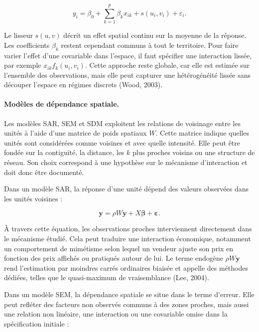 \documentclass[11pt,a4paper]{article}
\begin{document}
\begin{equation}
    y_i=\beta_0+\sum_{k=1}^{p}\beta_kx_{ik}+s(u_i,v_i)+\varepsilon_i.
\end{equation}

Le lisseur $s(u,v)$ décrit un effet spatial continu sur la moyenne de la réponse. Les coefficients $\beta_k$ restent cependant communs à tout le territoire. Pour faire varier l'effet d'une covariable dans l'espace, il faut spécifier une interaction lissée, par exemple $x_{ik}f_k(u_i,v_i)$. Cette approche reste globale, car elle est estimée sur l'ensemble des observations, mais elle peut capturer une hétérogénéité lissée sans découper l'espace en régimes discrets (Wood, 2003).

\paragraph{Modèles de dépendance spatiale.}

Les modèles SAR, SEM et SDM exploitent les relations de voisinage entre les unités à l'aide d'une matrice de poids spatiaux $W$. Cette matrice indique quelles unités sont considérées comme voisines et avec quelle intensité. Elle peut être fondée sur la contiguïté, la distance, les $k$ plus proches voisins ou une structure de réseau. Son choix correspond à une hypothèse sur le mécanisme d'interaction et doit donc être documenté.

Dans un modèle SAR, la réponse d'une unité dépend des valeurs observées dans les unités voisines :

\begin{equation}
    \mathbf{y}=\rho W\mathbf{y}+X\boldsymbol{\beta}+\boldsymbol{\varepsilon}.
\end{equation}

À travers cette équation, les observations proches interviennent directement dans le mécanisme étudié. Cela peut traduire une interaction économique, notamment un comportement de mimétisme selon lequel un vendeur ajuste son prix en fonction des prix affichés ou pratiqués autour de lui. Le terme endogène $\rho W\mathbf{y}$ rend l'estimation par moindres carrés ordinaires biaisée et appelle des méthodes dédiées, telles que le quasi-maximum de vraisemblance (Lee, 2004).

Dans un modèle SEM, la dépendance spatiale se situe dans le terme d'erreur. Elle peut refléter des facteurs non observés communs à des zones proches, mais aussi une relation non linéaire, une interaction ou une covariable omise dans la spécification initiale :
\end{document}
